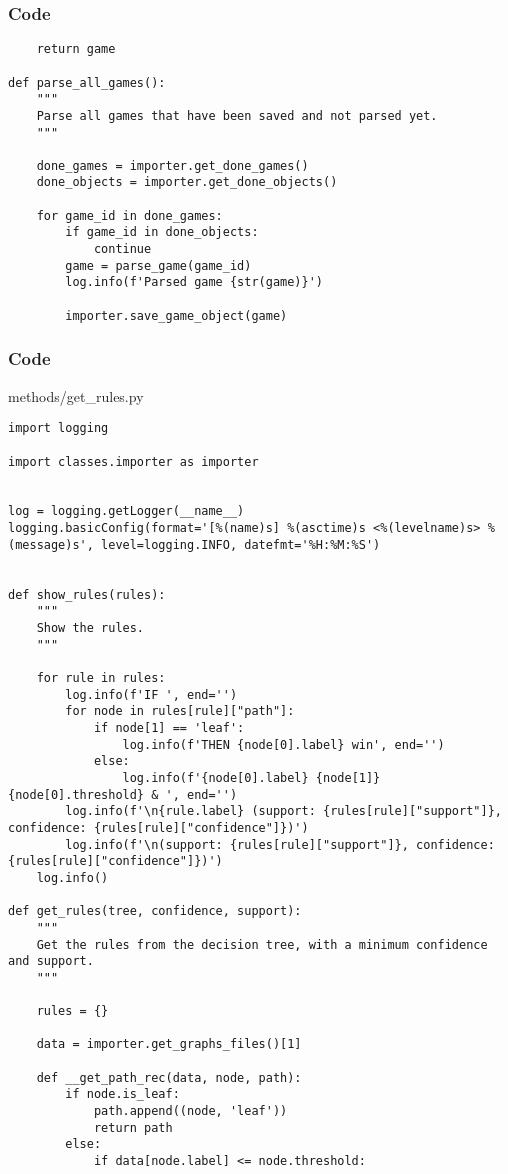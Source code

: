 \documentclass{beamer}
\begin{document}
\begin{frame}[t, fragile]
    \frametitle{Code}
    \fontsize{3pt}{5pt}\selectfont
    \begin{verbatim}
    return game
    
def parse_all_games():
    """
    Parse all games that have been saved and not parsed yet.
    """
    
    done_games = importer.get_done_games()
    done_objects = importer.get_done_objects()

    for game_id in done_games:
        if game_id in done_objects:
            continue
        game = parse_game(game_id)
        log.info(f'Parsed game {str(game)}')
    
        importer.save_game_object(game)
    \end{verbatim}
\end{frame}


\begin{frame}[fragile]
    \frametitle{Code}
    \scriptsize
    methods/get\_rules.py \newline
    \fontsize{3pt}{5pt}\selectfont
    \begin{verbatim}
import logging

import classes.importer as importer


log = logging.getLogger(__name__)
logging.basicConfig(format='[%(name)s] %(asctime)s <%(levelname)s> %(message)s', level=logging.INFO, datefmt='%H:%M:%S')


def show_rules(rules):
    """
    Show the rules.
    """

    for rule in rules:
        log.info(f'IF ', end='')
        for node in rules[rule]["path"]:
            if node[1] == 'leaf':
                log.info(f'THEN {node[0].label} win', end='')
            else:
                log.info(f'{node[0].label} {node[1]} {node[0].threshold} & ', end='')
        log.info(f'\n{rule.label} (support: {rules[rule]["support"]}, confidence: {rules[rule]["confidence"]})')
        log.info(f'\n(support: {rules[rule]["support"]}, confidence: {rules[rule]["confidence"]})')
    log.info()

def get_rules(tree, confidence, support):
    """
    Get the rules from the decision tree, with a minimum confidence and support.
    """
    
    rules = {}

    data = importer.get_graphs_files()[1]

    def __get_path_rec(data, node, path):
        if node.is_leaf:
            path.append((node, 'leaf'))
            return path
        else:
            if data[node.label] <= node.threshold:
    \end{verbatim}
\end{frame}
\end{document}
